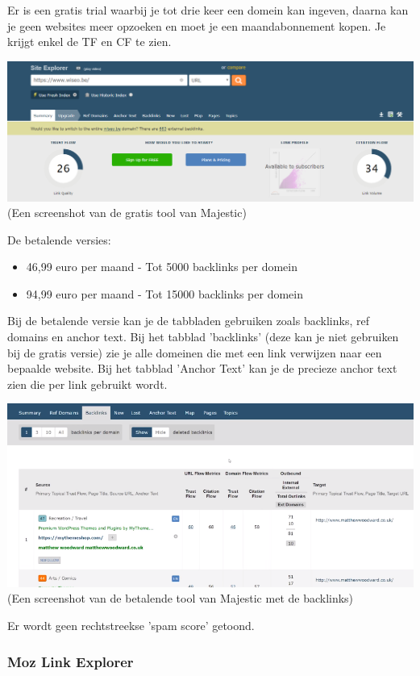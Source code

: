 Er is een gratis trial waarbij je tot drie keer een domein kan ingeven, daarna kan je geen websites meer opzoeken en moet je een maandabonnement kopen. Je krijgt enkel de TF en CF te zien.

\includegraphics[width=\linewidth]{Bachelorproef/bachelor/img/majesticgratis.PNG}
(Een screenshot van de gratis tool van Majestic)

De betalende versies: 
\begin{itemize}
\item 46,99 euro per maand - Tot 5000 backlinks per domein
\item 94,99 euro per maand - Tot 15000 backlinks per domein
\end{itemize}

Bij de betalende versie kan je de tabbladen gebruiken zoals backlinks, ref domains en anchor text. Bij het tabblad 'backlinks' (deze kan je niet gebruiken bij de gratis versie) zie je alle domeinen die met een link verwijzen naar een bepaalde website. Bij het tabblad 'Anchor Text' kan je de precieze anchor text zien die per link gebruikt wordt. 

\includegraphics[width=\linewidth]{Bachelorproef/bachelor/img/majesticbacklink.PNG}
(Een screenshot van de betalende tool van Majestic met de backlinks)

Er wordt geen rechtstreekse 'spam score' getoond. 

\subsubsection{Moz Link Explorer}
\label{ch: Moz Link Explorer}

